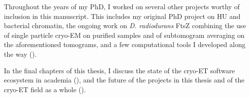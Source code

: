Throughout the years of my PhD, I worked on several other projects worthy of inclusion in this manuscript.
This includes my original PhD project on HU and bacterial chromatin, the ongoing work on \textit{D. radiodurans} FtsZ combining the use of single particle cryo-EM on purified samples and of subtomogram averaging on the aforementioned tomograms, and a few computational tools I developed along the way ().

In the final chapters of this thesis, I discuss the state of the cryo-ET software ecosystem in academia (), and the future of the projects in this thesis and of the cryo-ET field as a whole ().
